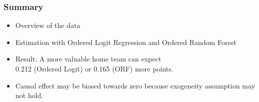 \documentclass{beamer}
\begin{document}




\begin{frame}
\frametitle{Summary}

\begin{itemize}
\item Overview of the data
\item Estimation with Ordered Logit Regression and Ordered Random Forest
\item Result: A more valuable home team can expect \\ 0.212 (Ordered Logit) or 0.165 (ORF) more points.
\item Causal effect may be biased towards zero because exogeneity assumption may not hold. 
\end{itemize}

\end{frame}
\end{document}
